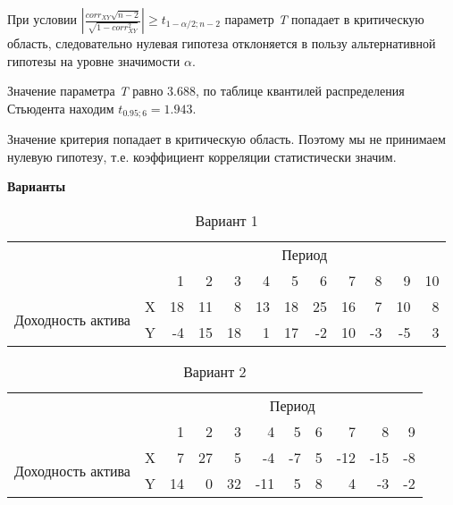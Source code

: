 \documentclass[12pt,a4paper]{article}
\begin{document}
\begin{taskrus}
При условии $\left|\frac{corr_{XY}\sqrt{n-2}}{\sqrt{1-corr_{XY}^2}}\right|\geq t_{1-\alpha/2;n-2}$ параметр \textit{T} попадает в критическую область, следовательно нулевая гипотеза отклоняется в пользу альтернативной гипотезы на уровне значимости $\alpha$.

Значение параметра \textit{T} равно 3.688, по таблице квантилей распределения Стьюдента находим $t_{0.95;6}=1.943$.

Значение критерия попадает в критическую область. Поэтому мы не принимаем нулевую гипотезу, т.е. коэффициент корреляции статистически значим.

\textbf{Варианты}

\begin{table}[H]
  \centering
  \caption{Вариант 1}
    \begin{tabular}{rrrrrrrrrrrr}
    \toprule
    \multicolumn{2}{c}{\multirow{2}[1]{*}{}} & \multicolumn{10}{c}{Период} \\\cmidrule{3-12}
    \multicolumn{2}{c}{} & 1     & 2     & 3     & 4     & 5     & 6     & 7     & 8     & 9     & 10 \\
    \midrule
    \multicolumn{1}{l}{\multirow{2}[1]{*}{Доходность актива}} & X     & 18    & 11    & 8     & 13    & 18    & 25    & 16    & 7     & 10    & 8 \\
    \multicolumn{1}{l}{} & Y     & -4    & 15    & 18    & 1     & 17    & -2    & 10    & -3    & -5    & 3 \\
    \bottomrule
    \end{tabular}%
  \label{tab:addlabel}%
\end{table}%

\begin{table}[H]
  \centering
  \caption{Вариант 2}
    \begin{tabular}{rrrrrrrrrrr}
    \toprule
    \multicolumn{2}{c}{\multirow{2}[1]{*}{}} & \multicolumn{9}{c}{Период} \\\cmidrule{3-11}
    \multicolumn{2}{c}{} & 1     & 2     & 3     & 4     & 5     & 6     & 7     & 8     & 9 \\
    \midrule
    \multicolumn{1}{l}{\multirow{2}[1]{*}{Доходность актива}} & X     & 7     & 27    & 5     & -4    & -7    & 5     & -12   & -15   & -8 \\
    \multicolumn{1}{l}{} & Y     & 14    & 0     & 32    & -11   & 5     & 8     & 4     & -3    & -2 \\
    \bottomrule
    \end{tabular}%
  \label{tab:addlabel}%
\end{table}%



\end{taskrus}
\end{document}
